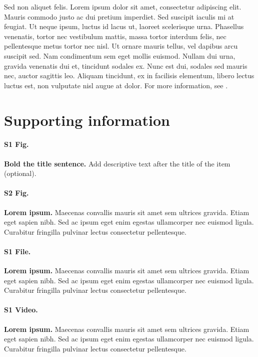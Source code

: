 \documentclass[10pt,letterpaper]{article}
\begin{document}
Sed non aliquet felis. Lorem ipsum dolor sit amet, consectetur adipiscing elit. Mauris commodo justo ac dui pretium imperdiet. Sed suscipit iaculis mi at feugiat. Ut neque ipsum, luctus id lacus ut, laoreet scelerisque urna. Phasellus venenatis, tortor nec vestibulum mattis, massa tortor interdum felis, nec pellentesque metus tortor nec nisl. Ut ornare mauris tellus, vel dapibus arcu suscipit sed. Nam condimentum sem eget mollis euismod. Nullam dui urna, gravida venenatis dui et, tincidunt sodales ex. Nunc est dui, sodales sed mauris nec, auctor sagittis leo. Aliquam tincidunt, ex in facilisis elementum, libero lectus luctus est, non vulputate nisl augue at dolor. For more information, see .

\section*{Supporting information}

\paragraph*{S1 Fig.}
\label{S1_Fig}
{\bf Bold the title sentence.} Add descriptive text after the title of the item (optional).

\paragraph*{S2 Fig.}
\label{S2_Fig}
{\bf Lorem ipsum.} Maecenas convallis mauris sit amet sem ultrices gravida. Etiam eget sapien nibh. Sed ac ipsum eget enim egestas ullamcorper nec euismod ligula. Curabitur fringilla pulvinar lectus consectetur pellentesque.

\paragraph*{S1 File.}
\label{S1_File}
{\bf Lorem ipsum.}  Maecenas convallis mauris sit amet sem ultrices gravida. Etiam eget sapien nibh. Sed ac ipsum eget enim egestas ullamcorper nec euismod ligula. Curabitur fringilla pulvinar lectus consectetur pellentesque.

\paragraph*{S1 Video.}
\label{S1_Video}
{\bf Lorem ipsum.}  Maecenas convallis mauris sit amet sem ultrices gravida. Etiam eget sapien nibh. Sed ac ipsum eget enim egestas ullamcorper nec euismod ligula. Curabitur fringilla pulvinar lectus consectetur pellentesque.
\end{document}
